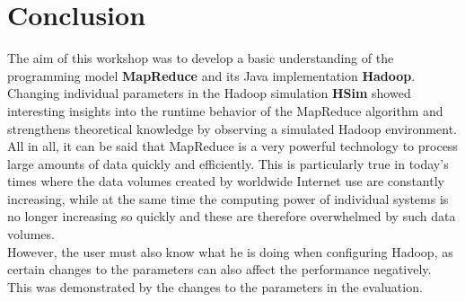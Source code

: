\chapter{Conclusion}
\label{conlusion}
The aim of this workshop was to develop a basic understanding of the programming model \textbf{MapReduce} and its Java implementation \textbf{Hadoop}. Changing individual parameters in the Hadoop simulation \textbf{HSim} showed interesting insights into the runtime behavior of the MapReduce algorithm and strengthens theoretical knowledge by observing a simulated Hadoop environment.
\\
All in all, it can be said that MapReduce is a very powerful technology to process large amounts of data quickly and efficiently. This is particularly true in today's times where the data volumes created by worldwide Internet use are constantly increasing, while at the same time the computing power of individual systems is no longer increasing so quickly and these are therefore overwhelmed by such data volumes.
\\
However, the user must also know what he is doing when configuring Hadoop, as certain changes to the parameters can also affect the performance negatively. This was demonstrated by the changes to the parameters in the evaluation.


